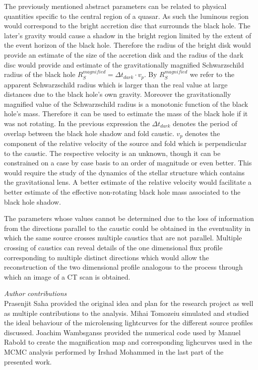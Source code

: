 \documentclass[usenatbib]{mn2e}
\begin{document}
The previously mentioned abstract parameters can be related to
physical quantities specific to the central region of a quasar.  As
such the luminous region would correspond to the bright accretion disc
that surrounds the black hole. The later's gravity would cause a
shadow in the bright region limited by the extent of the event horizon
of the black hole. Therefore the radius of the bright disk would
provide an estimate of the size of the accretion disk and the radius
of the dark disc would provide and estimate of the gravitationally
magnified Schwarzschild radius of the black hole $R_{S}^{magnified} =
\Delta t_{dark} \cdot v_p$.  By $R_{S}^{magnified}$ we refer to the
apparent Schwarzschild radius which is larger than the real value at
large distances due to the black hole's own gravity.  Moreover the
gravitationally magnified value of the Schwarzschild radius is a
monotonic function of the black hole's mass. Therefore it can be used
to estimate the mass of the black hole if it was not rotating. In the
previous expression the $\Delta t_{dark}$ denotes the period of
overlap between the black hole shadow and fold caustic.  $v_p$ denotes
the component of the relative velocity of the source and fold which is
perpendicular to the caustic.  The respective velocity is an unknown,
though it can be constrained on a case by case basis to an order of
magnitude or even better. This would require the study of the dynamics
of the stellar structure which contains the gravitational lens.  A
better estimate of the relative velocity would facilitate a better
estimate of the effective non-rotating black hole mass associated to
the black hole shadow.

    
The parameters whose values cannot be determined due to the loss of information from the directions parallel to the 
caustic could be obtained in the eventuality in which the same source crosses multiple caustics that are not parallel. 
Multiple crossing of caustics can reveal details of the one dimensional flux profile corresponding to multiple distinct 
directions which would allow the reconstruction of the two dimensional profile analogous to the process through which an image of a CT scan is obtained.  

\textit{Author contributions}\\
Prasenjit Saha provided the original idea and plan for the research project as well as multiple contributions to the analysis.
 Mihai Tomozeiu simulated and studied the ideal behaviour of the microlensing lightcurves for the different source profiles discussed.
 Joachim Wambsganss provided the numerical code used by Manuel Rabold to create the magnification map and corresponding lighcurves 
used in the MCMC analysis performed by Irshad Mohammed in the last part of the presented work.





\def\apj{ApJ}
\def\apjl{ApJL}
\def\aj{AJ}
\def\mnras{MNRAS}
\def\aap{A\&A}
\def\nat{nature}
\def\araa{ARAA}
\def\pasa{PASA}

\end{document}
